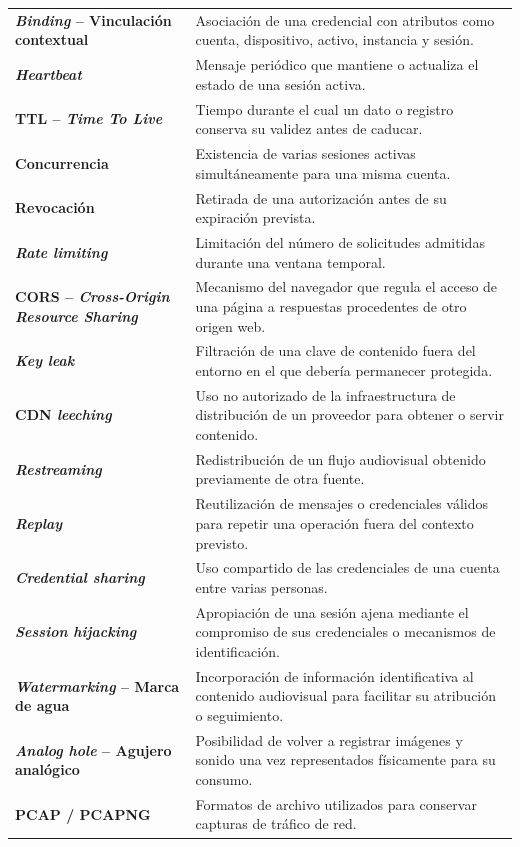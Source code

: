 \begin{longtable}{@{}>{\raggedright\arraybackslash\bfseries}p{}>{\raggedright\arraybackslash}p{}@{}}
\textit{Binding} -- Vinculación contextual & Asociación de una credencial con atributos como cuenta, dispositivo, activo, instancia y sesión. \\
\textit{Heartbeat} & Mensaje periódico que mantiene o actualiza el estado de una sesión activa. \\
TTL -- \textit{Time To Live} & Tiempo durante el cual un dato o registro conserva su validez antes de caducar. \\
Concurrencia & Existencia de varias sesiones activas simultáneamente para una misma cuenta. \\
Revocación & Retirada de una autorización antes de su expiración prevista. \\
\textit{Rate limiting} & Limitación del número de solicitudes admitidas durante una ventana temporal. \\
CORS -- \textit{Cross-Origin Resource Sharing} & Mecanismo del navegador que regula el acceso de una página a respuestas procedentes de otro origen web. \\
\textit{Key leak} & Filtración de una clave de contenido fuera del entorno en el que debería permanecer protegida. \\
CDN \textit{leeching} & Uso no autorizado de la infraestructura de distribución de un proveedor para obtener o servir contenido. \\
\textit{Restreaming} & Redistribución de un flujo audiovisual obtenido previamente de otra fuente. \\
\textit{Replay} & Reutilización de mensajes o credenciales válidos para repetir una operación fuera del contexto previsto. \\
\textit{Credential sharing} & Uso compartido de las credenciales de una cuenta entre varias personas. \\
\textit{Session hijacking} & Apropiación de una sesión ajena mediante el compromiso de sus credenciales o mecanismos de identificación. \\
\textit{Watermarking} -- Marca de agua & Incorporación de información identificativa al contenido audiovisual para facilitar su atribución o seguimiento. \\
\textit{Analog hole} -- Agujero analógico & Posibilidad de volver a registrar imágenes y sonido una vez representados físicamente para su consumo. \\
PCAP / PCAPNG & Formatos de archivo utilizados para conservar capturas de tráfico de red. \\

\end{longtable}

\normalsize
\chapterend

